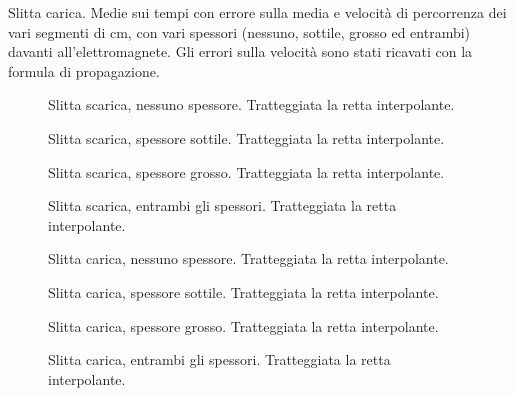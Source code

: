 \documentclass[italian,a4paper]{article}
\begin{document}
\begin{table}[p]\caption{Slitta carica. Medie sui tempi con errore sulla media e velocità di percorrenza dei vari segmenti di \unit[20]{cm}, con vari spessori (nessuno, sottile, grosso ed entrambi) davanti all'elettromagnete. Gli errori sulla velocità sono stati ricavati con la formula di propagazione.}\label{tabtvcarica}
 \centering \small
 
\end{table}
\clearpage
 \begin {figure}[p]\caption{Slitta scarica, nessuno spessore. Tratteggiata la retta interpolante.}\label{scarico0}
\centering
        
\end{figure}
 \begin {figure}[p]\caption{Slitta scarica, spessore sottile. Tratteggiata la retta interpolante.}\label{scaricos}
\centering
        
\end{figure}
 \begin {figure}[p]\caption{Slitta scarica, spessore grosso. Tratteggiata la retta interpolante.}\label{scaricog}
\centering
        
\end{figure}
 \begin {figure}[p]\caption{Slitta scarica, entrambi gli spessori. Tratteggiata la retta interpolante.}\label{scaricogg}
\centering
        
\end{figure}
 \begin {figure}[p]\caption{Slitta carica, nessuno spessore. Tratteggiata la retta interpolante.}\label{carico0}
\centering
        
\end{figure}
 \begin {figure}[p]\caption{Slitta carica, spessore sottile. Tratteggiata la retta interpolante.}\label{caricos}
\centering
        
\end{figure}
 \begin {figure}[p]\caption{Slitta carica, spessore grosso. Tratteggiata la retta interpolante.}\label{caricog}
\centering
        
\end{figure}
 \begin {figure}[p]\caption{Slitta carica, entrambi gli spessori. Tratteggiata la retta interpolante.}\label{caricogg}
\centering
        
\end{figure}
\end{document}
